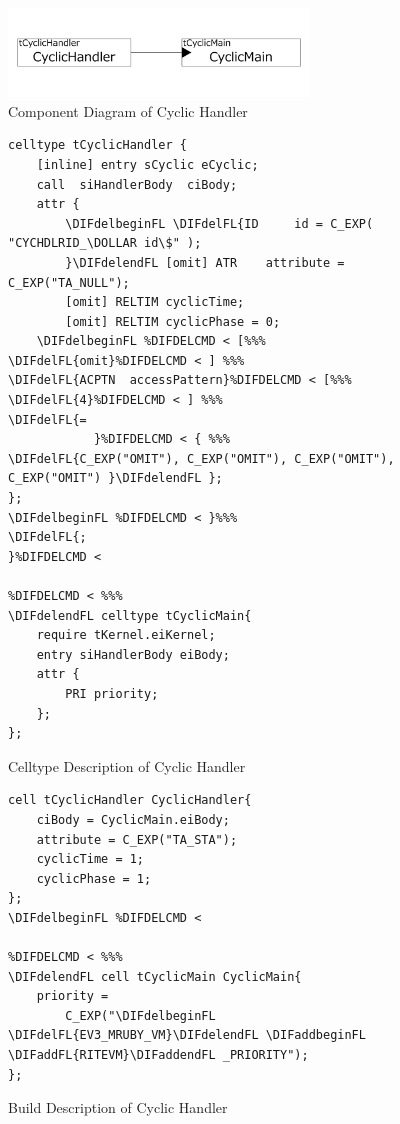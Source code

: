 \documentclass[conference,compsoc]{IEEEtran}
\providecommand{\DIFadd}[1]{{\protect\color{blue}\uwave{#1}}} %
\providecommand{\DIFdel}[1]{{\protect\color{red}\sout{#1}}}                      %
\providecommand{\DIFaddFL}[1]{\DIFadd{#1}} %
\providecommand{\DIFdelFL}[1]{\DIFdel{#1}} %
\providecommand{\DIFaddbeginFL}{} %
\providecommand{\DIFaddendFL}{} %
\providecommand{\DIFdelbeginFL}{} %
\providecommand{\DIFdelendFL}{} %
\begin{document}
\begin{figure}[t]
    \centering
    \includegraphics[width=8cm,clip]{figure/cyclic_handler.pdf}
    \caption{Component Diagram of Cyclic Handler}
    \label{fig:cyclic_handler}
\end{figure}
\begin{figure}[t]
    \centering
    \begin{lstlisting}
celltype tCyclicHandler {
    [inline] entry sCyclic eCyclic;
    call  siHandlerBody  ciBody;
    attr {
    	\DIFdelbeginFL \DIFdelFL{ID     id = C_EXP( "CYCHDLRID_\DOLLAR id\$" );
    	}\DIFdelendFL [omit] ATR    attribute = C_EXP("TA_NULL");
    	[omit] RELTIM cyclicTime;
    	[omit] RELTIM cyclicPhase = 0;
    \DIFdelbeginFL %DIFDELCMD < [%%%
\DIFdelFL{omit}%DIFDELCMD < ] %%%
\DIFdelFL{ACPTN  accessPattern}%DIFDELCMD < [%%%
\DIFdelFL{4}%DIFDELCMD < ] %%%
\DIFdelFL{=
            }%DIFDELCMD < { %%%
\DIFdelFL{C_EXP("OMIT"), C_EXP("OMIT"), C_EXP("OMIT"), C_EXP("OMIT") }\DIFdelendFL };
};
\DIFdelbeginFL %DIFDELCMD < }%%%
\DIFdelFL{;
}%DIFDELCMD < 

%DIFDELCMD < %%%
\DIFdelendFL celltype tCyclicMain{
    require tKernel.eiKernel;
    entry siHandlerBody eiBody;
    attr {
        PRI priority;
    };
};
    \end{lstlisting}
    \caption{Celltype Description of Cyclic Handler}
    \label{celltype_cyclic_handler}
\end{figure}
\begin{figure}[t]
    \centering
    \begin{lstlisting}
cell tCyclicHandler CyclicHandler{
    ciBody = CyclicMain.eiBody;
    attribute = C_EXP("TA_STA");
    cyclicTime = 1;
    cyclicPhase = 1;
};
\DIFdelbeginFL %DIFDELCMD < 

%DIFDELCMD < %%%
\DIFdelendFL cell tCyclicMain CyclicMain{
    priority =
        C_EXP("\DIFdelbeginFL \DIFdelFL{EV3_MRUBY_VM}\DIFdelendFL \DIFaddbeginFL \DIFaddFL{RITEVM}\DIFaddendFL _PRIORITY");
};
   \end{lstlisting}
    \caption{Build Description of Cyclic Handler}
    \label{build_cyclic_handler}
\end{figure}
\end{document}
